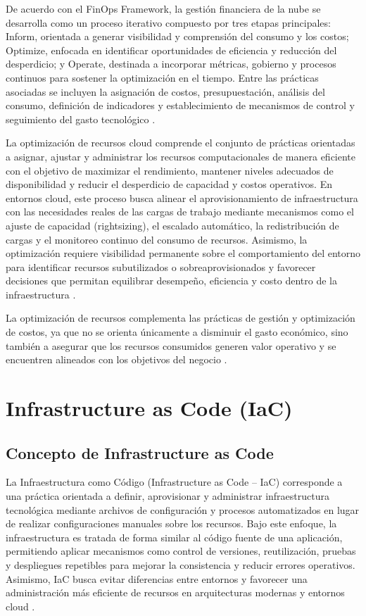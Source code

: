 De acuerdo con el FinOps Framework, la gestión financiera de la nube se desarrolla como un proceso iterativo compuesto por tres etapas principales: Inform, orientada a generar visibilidad y comprensión del consumo y los costos; Optimize, enfocada en identificar oportunidades de eficiencia y reducción del desperdicio; y Operate, destinada a incorporar métricas, gobierno y procesos continuos para sostener la optimización en el tiempo. Entre las prácticas asociadas se incluyen la asignación de costos, presupuestación, análisis del consumo, definición de indicadores y establecimiento de mecanismos de control y seguimiento del gasto tecnológico \parencite{FinOpsFramework2026}.

La optimización de recursos cloud comprende el conjunto de prácticas orientadas a asignar, ajustar y administrar los recursos computacionales de manera eficiente con el objetivo de maximizar el rendimiento, mantener niveles adecuados de disponibilidad y reducir el desperdicio de capacidad y costos operativos. En entornos cloud, este proceso busca alinear el aprovisionamiento de infraestructura con las necesidades reales de las cargas de trabajo mediante mecanismos como el ajuste de capacidad (rightsizing), el escalado automático, la redistribución de cargas y el monitoreo continuo del consumo de recursos. Asimismo, la optimización requiere visibilidad permanente sobre el comportamiento del entorno para identificar recursos subutilizados o sobreaprovisionados y favorecer decisiones que permitan equilibrar desempeño, eficiencia y costo dentro de la infraestructura \parencite{IBM2026, FinOpsFramework2026}.

La optimización de recursos complementa las prácticas de gestión y optimización de costos, ya que no se orienta únicamente a disminuir el gasto económico, sino también a asegurar que los recursos consumidos generen valor operativo y se encuentren alineados con los objetivos del negocio \parencite{IBM2026, FinOps2026}.

\section{Infrastructure as Code (IaC)}

\subsection{Concepto de Infrastructure as Code}

La Infraestructura como Código (Infrastructure as Code -- IaC) corresponde a una práctica orientada a definir, aprovisionar y administrar infraestructura tecnológica mediante archivos de configuración y procesos automatizados en lugar de realizar configuraciones manuales sobre los recursos. Bajo este enfoque, la infraestructura es tratada de forma similar al código fuente de una aplicación, permitiendo aplicar mecanismos como control de versiones, reutilización, pruebas y despliegues repetibles para mejorar la consistencia y reducir errores operativos. Asimismo, IaC busca evitar diferencias entre entornos y favorecer una administración más eficiente de recursos en arquitecturas modernas y entornos cloud \parencite{Microsoft2025}.

